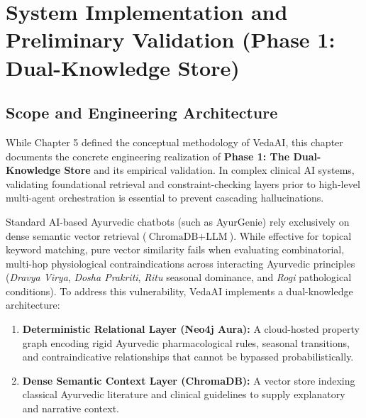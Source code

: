 
\chapter{System Implementation and Preliminary Validation (Phase 1: Dual-Knowledge Store)}
\label{chap:implementation}

\section{Scope and Engineering Architecture}
\label{sec:arch_overview}
While Chapter 5 defined the conceptual methodology of VedaAI, this chapter documents the concrete engineering realization of \textbf{Phase 1: The Dual-Knowledge Store} and its empirical validation. In complex clinical AI systems, validating foundational retrieval and constraint-checking layers prior to high-level multi-agent orchestration is essential to prevent cascading hallucinations.

Standard AI-based Ayurvedic chatbots (such as AyurGenie) rely exclusively on dense semantic vector retrieval ($\text{ChromaDB} + \text{LLM}$). While effective for topical keyword matching, pure vector similarity fails when evaluating combinatorial, multi-hop physiological contraindications across interacting Ayurvedic principles (\textit{Dravya Virya}, \textit{Dosha Prakriti}, \textit{Ritu} seasonal dominance, and \textit{Rogi} pathological conditions). To address this vulnerability, VedaAI implements a dual-knowledge architecture:

\begin{enumerate}
    \item \textbf{Deterministic Relational Layer (Neo4j Aura):} A cloud-hosted property graph encoding rigid Ayurvedic pharmacological rules, seasonal transitions, and contraindicative relationships that cannot be bypassed probabilistically.
    \item \textbf{Dense Semantic Context Layer (ChromaDB):} A vector store indexing classical Ayurvedic literature and clinical guidelines to supply explanatory and narrative context.
\end{enumerate}

